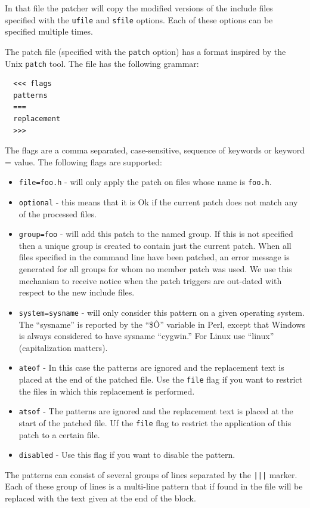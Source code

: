 \documentclass[letterpaper]{article}
\def\t#1{{\tt #1}}
\begin{document}
 In that file the patcher will copy the modified versions of the include files
specified with the \t{ufile} and \t{sfile} options. Each of these options can
be specified multiple times.

 The patch file (specified with the \t{patch} option) has a format inspired by
the Unix \t{patch} tool. The file has the following grammar:

\begin{verbatim}
  <<< flags
  patterns
  ===
  replacement
  >>>
\end{verbatim}

 The flags are a comma separated, case-sensitive, sequence of keywords or
keyword = value. The following flags are supported:
\begin{itemize}
\item \t{file=foo.h} - will only apply the patch on files whose name is
                       \t{foo.h}.
\item \t{optional} - this means that it is Ok if the current patch does not
match any of the processed files.
\item \t{group=foo} - will add this patch to the named group. If this is not
specified then a unique group is created to contain just the current patch.
When all files specified in the command line have been patched, an error
message is generated for all groups for whom no member patch was used. We use
this mechanism to receive notice when the patch triggers are out-dated with
respect to the new include files.
\item \t{system=sysname} - will only consider this pattern on a given
operating system. The ``sysname'' is reported by the ``\$\^O'' variable in
Perl, except that Windows is always considered to have sysname
``cygwin.'' For Linux use ``linux'' (capitalization matters).
\item \t{ateof} - In this case the patterns are ignored and the replacement
text is placed at the end of the patched file. Use the \t{file} flag if you
want to restrict the files in which this replacement is performed.
\item \t{atsof} - The patterns are ignored and the replacement text is placed
at the start of the patched file. Uf the \t{file} flag to restrict the
application of this patch to a certain file.
\item \t{disabled} - Use this flag if you want to disable the pattern.
\end{itemize}


 The patterns can consist of several groups of lines separated by the \t{|||}
marker. Each of these group of lines is a multi-line pattern that if found in
the file will be replaced with the text given at the end of the block.
\end{document}
